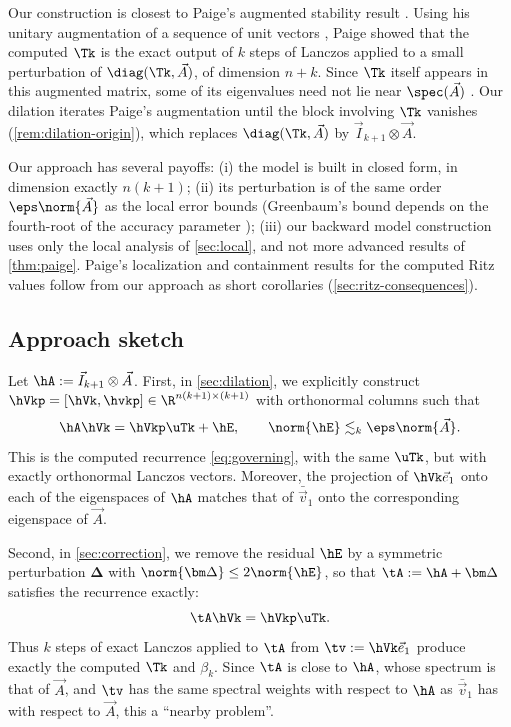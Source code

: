 Our construction is closest to Paige's augmented stability result \cite{paige2010}.
Using his unitary augmentation of a sequence of unit vectors \cite{paige2009}, Paige showed that the computed \(\Tk\) is the exact output of \(k\) steps of Lanczos applied to a small perturbation of \(\diag(\Tk,\vec A)\), of dimension \(n+k\).
Since \(\Tk\) itself appears in this augmented matrix, some of its eigenvalues need not lie near \(\spec(\vec A)\) \cite[\S3.3]{paige2010}.
Our dilation iterates Paige's augmentation until the block involving \(\Tk\) vanishes (\cref{rem:dilation-origin}), which replaces \(\diag(\Tk,\vec A)\) by \(\vec I_{k+1}\otimes\vec A\).

Our approach has several payoffs: (i) the model is built in closed form, in dimension exactly \(n(k+1)\); (ii) its perturbation is of the same order \(\eps\norm{\vec A}\) as the local error bounds (Greenbaum's bound depends on the fourth-root of the accuracy parameter \cite[eq.~(7.10)]{greenbaum1989}); (iii) our backward model construction uses only the local analysis of \cref{sec:local}, and not more advanced results of \cref{thm:paige}.
Paige's localization and containment results for the computed Ritz values follow from our approach as short corollaries (\cref{sec:ritz-consequences}).

\subsection{Approach sketch}
\label{sec:backward-sketch}

Let \(\hA:=\vec I_{k+1}\otimes\vec A\).
First, in \cref{sec:dilation}, we explicitly construct \(\hVkp=[\hVk,\hvkp]\in\R^{n(k+1)\times(k+1)}\) with orthonormal columns such that
\[
 \hA\hVk=\hVkp\uTk+\hE,
 \qquad
 \norm{\hE}\lesssim_k\eps\norm{\vec A}.
\]
This is the computed recurrence \cref{eq:governing}, with the same \(\uTk\), but with exactly orthonormal Lanczos vectors.
Moreover, the projection of \(\hVk\vec e_1\) onto each of the eigenspaces of \(\hA\) matches that of \(\bar{\vec v}_1\) onto the corresponding eigenspace of \(\vec A\).


Second, in \cref{sec:correction}, we remove the residual \(\hE\) by a symmetric perturbation \(\bm\Delta\) with \(\norm{\bm\Delta}\le2\norm{\hE}\), so that \(\tA:=\hA+\bm\Delta\) satisfies the recurrence exactly:
\[
 \tA\hVk=\hVkp\uTk.
\]
Thus \(k\) steps of exact Lanczos applied to \(\tA\) from \(\tv:=\hVk\vec e_1\) produce exactly the computed \(\Tk\) and \(\beta_k\).
Since \(\tA\) is close to \(\hA\), whose spectrum is that of \(\vec A\), and \(\tv\) has the same spectral weights with respect to \(\hA\) as \(\bar{\vec v}_1\) has with respect to \(\vec A\), this a ``nearby problem''.

